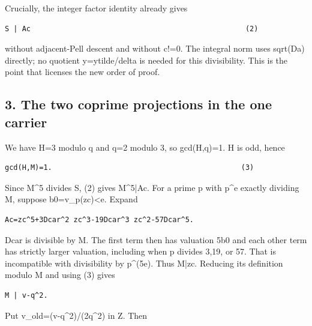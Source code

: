 Crucially, the integer factor identity already gives



\begin{verbatim}
S | Ac                                                  (2)
\end{verbatim}

without adjacent-Pell descent and without c!=\allowbreak{}0. The integral norm uses sqrt(Da) directly; no quotient y=\allowbreak{}ytilde/\allowbreak{}delta is needed for this divisibility. This is the point that licenses the new order of proof.



\subsection*{3. The two coprime projections in the one carrier}



We have H=\allowbreak{}3 modulo q and q=\allowbreak{}2 modulo 3, so gcd(H,q)=\allowbreak{}1. H is odd, hence



\begin{verbatim}
gcd(H,M)=1.                                            (3)
\end{verbatim}

Since M\textasciicircum{}\allowbreak{}5 divides S, (2) gives M\textasciicircum{}\allowbreak{}5|Ac. For a prime p with p\textasciicircum{}\allowbreak{}e exactly dividing M, suppose b0=\allowbreak{}v\_\allowbreak{}p(zc)\textless{}\allowbreak{}e. Expand



\begin{verbatim}
Ac=zc^5+3Dcar^2 zc^3-19Dcar^3 zc^2-57Dcar^5.
\end{verbatim}

Dcar is divisible by M. The first term then has valuation 5b0 and each other term has strictly larger valuation, including when p divides 3,19, or 57. That is incompatible with divisibility by p\textasciicircum{}\allowbreak{}(5e). Thus M|zc. Reducing its definition modulo M and using (3) gives



\begin{verbatim}
M | v-q^2.
\end{verbatim}

Put v\_\allowbreak{}old=\allowbreak{}(v-q\textasciicircum{}\allowbreak{}2)/\allowbreak{}(2q\textasciicircum{}\allowbreak{}2) in Z. Then



